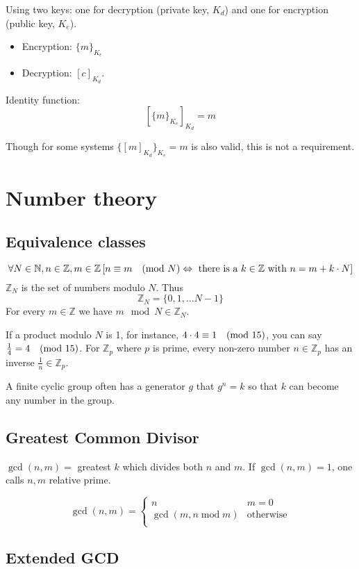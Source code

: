 \documentclass{article}
\newcommand{\wmod}[1]{\text{\quad (mod }#1\text{)}}
\newcommand{\Z}{\mathbb{Z}}
\newcommand{\N}{\mathbb{N}}
\begin{document}
Using two keys: one for decryption (private key, $K_d$) and one for encryption
(public key, $K_e$).

\begin{itemize}
  \item Encryption: $\{m\}_{K_e} $
  \item Decryption: $[c]_{K_d}$.
\end{itemize}

Identity function: 
\[
  [\{m\}_{K_e}]_{K_d} = m
\]

Though for some systems $\{[m]_{K_d}\}_{K_e} =m$ is also valid, this is not
a requirement.

\section{Number theory}

\subsection{Equivalence classes}

\[ \forall N \in \N, n \in \Z, m \in \Z 
  \,[n \equiv m \wmod{N} \Leftrightarrow 
      \text{ there is a } k \in \Z \text { with } n = m + k \cdot N]
\]
$\Z_N$ is the set of numbers modulo $N$. Thus 
\[ \Z_N = \{ 0, 1, \dots N-1\} \]
For every $m \in \Z$ we have $m \mod N \in \Z_N$.

If a product modulo $N$ is 1, for instance, $4 \cdot 4 \equiv 1 \wmod{15}$, you
can say $\frac{1}{4}=4 \wmod{15}$. For $\Z_p$ where $p$ is prime, every
non-zero number $n \in \Z_p$ has an inverse $\frac{1}{n} \in \Z_p$.

A finite cyclic group often has a generator $g$ that $g^n = k$ so that $k$ can become
any number in the group.

\subsection{Greatest Common Divisor}

$\gcd(n,m) = $ greatest $k$ which divides both $n$ and $m$. If $\gcd(n,m) = 1$, one
calls $n,m$ relative prime.

\[ 
  \gcd (n,m) = \begin{cases}
    n & m=0 \\
    \gcd(m, n \operatorname{mod} m) & \text{otherwise}\\
  \end{cases}
\]

\subsection{Extended GCD}
\end{document}
